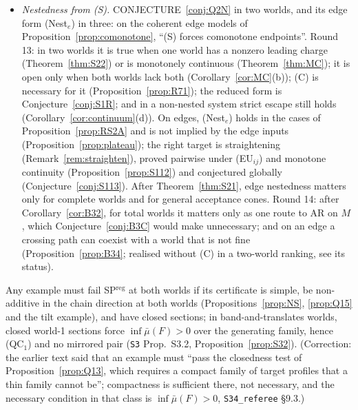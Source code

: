 \documentclass[11pt]{article}
\theoremstyle{definition}
\theoremstyle{remark}
\newcommand{\src}[1]{\texttt{#1}}
\begin{document}
\begin{itemize}[leftmargin=*]
\item[\textbf{(R4)}] \emph{Nestedness from (S).} CONJECTURE~\ref{conj:Q2N} in two worlds, and its edge form (Nest$_e$) in three: on the coherent edge models of Proposition~\ref{prop:comonotone}, ``(S) forces comonotone endpoints''. Round 13: in two worlds it is true when one world has a nonzero leading charge (Theorem~\ref{thm:S22}) or is monotonely continuous (Theorem~\ref{thm:MC}); it is open only when both worlds lack both (Corollary~\ref{cor:MC}(b)); (C) is necessary for it (Proposition~\ref{prop:R71}); the reduced form is Conjecture~\ref{conj:S1R}; and in a non-nested system strict escape still holds (Corollary~\ref{cor:continuum}(d)). On edges, (Nest$_e$) holds in the cases of Proposition~\ref{prop:RS2A} and is not implied by the edge inputs (Proposition~\ref{prop:plateau}); the right target is straightening (Remark~\ref{rem:straighten}), proved pairwise under (EU$_{ij}$) and monotone continuity (Proposition~\ref{prop:S112}) and conjectured globally (Conjecture~\ref{conj:S113}). After Theorem~\ref{thm:S21}, edge nestedness matters only for complete worlds and for general acceptance cones. Round 14: after Corollary~\ref{cor:B32}, for total worlds it matters only as one route to AR on $M$, which Conjecture~\ref{conj:B3C} would make unnecessary; and on an edge a crossing path can coexist with a world that is not fine (Proposition~\ref{prop:B34}; realised without (C) in a two-world ranking, see its status).
\end{itemize}
Any example must fail SP$^{\mathrm{reg}}$ at both worlds if its certificate is simple, be non-additive in the chain direction at both worlds (Propositions~\ref{prop:NS}, \ref{prop:Q15} and the tilt example), and have closed sections; in band-and-translates worlds, closed world-1 sections force $\inf\bar\mu(F)>0$ over the generating family, hence (QC$_1$) and no mirrored pair (\src{S3} Prop.~S3.2, Proposition~\ref{prop:S32}). (Correction: the earlier text said that an example must ``pass the closedness test of Proposition~\ref{prop:Q13}, which requires a compact family of target profiles that a thin family cannot be''; compactness is sufficient there, not necessary, and the necessary condition in that class is $\inf\bar\mu(F)>0$, \src{S34\_referee} \S9.3.)
\end{document}
